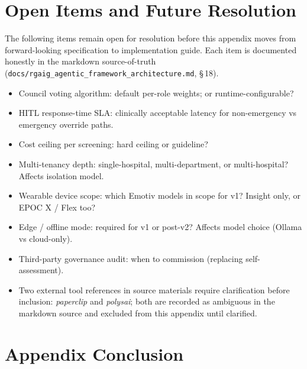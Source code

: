 \section{Open Items and Future Resolution}
\label{sec:appo_open_items}

The following items remain open for resolution before this appendix moves from forward-looking specification to implementation guide. Each item is documented honestly in the markdown source-of-truth (\texttt{docs/rgaig\_\allowbreak agentic\_\allowbreak framework\_\allowbreak architecture.md}, \S\,18).

\begin{itemize}[leftmargin=*, itemsep=2pt]
    \item Council voting algorithm: default per-role weights; or runtime-configurable?
    \item HITL response-time SLA: clinically acceptable latency for non-emergency vs emergency override paths.
    \item Cost ceiling per screening: hard ceiling or guideline?
    \item Multi-tenancy depth: single-hospital, multi-department, or multi-hospital? Affects isolation model.
    \item Wearable device scope: which Emotiv models in scope for v1? Insight only, or EPOC X / Flex too?
    \item Edge / offline mode: required for v1 or post-v2? Affects model choice (Ollama vs cloud-only).
    \item Third-party governance audit: when to commission (replacing self-assessment).
    \item Two external tool references in source materials require clarification before inclusion: \emph{paperclip} and \emph{polysai}; both are recorded as ambiguous in the markdown source and excluded from this appendix until clarified.
\end{itemize}

\section{Appendix Conclusion}
\label{sec:appo_conclusion}

